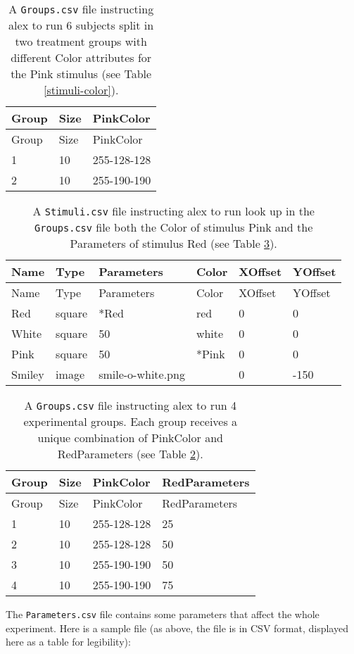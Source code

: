 \documentclass[11pt,]{article}
\begin{document}
\begin{longtable}[c]{@{}lll@{}}
\caption{A \texttt{Groups.csv} file instructing alex to run 6 subjects
split in two treatment groups with different Color attributes for the
Pink stimulus (see Table \ref{stimuli-color}).
\label{subjects-color}}\tabularnewline
\toprule
Group & Size & PinkColor\tabularnewline
\midrule
\endfirsthead
\toprule
Group & Size & PinkColor\tabularnewline
\midrule
\endhead
1 & 10 & 255-128-128\tabularnewline
2 & 10 & 255-190-190\tabularnewline
\bottomrule
\end{longtable}

\begin{longtable}[c]{@{}llllll@{}}
\caption{A \texttt{Stimuli.csv} file instructing alex to run look up in
the \texttt{Groups.csv} file both the Color of stimulus Pink and the
Parameters of stimulus Red (see Table \ref{subjects-color-parameters}).
\label{stimuli-color-parameters}}\tabularnewline
\toprule
Name & Type & Parameters & Color & XOffset & YOffset\tabularnewline
\midrule
\endfirsthead
\toprule
Name & Type & Parameters & Color & XOffset & YOffset\tabularnewline
\midrule
\endhead
Red & square & *Red & red & 0 & 0\tabularnewline
White & square & 50 & white & 0 & 0\tabularnewline
Pink & square & 50 & *Pink & 0 & 0\tabularnewline
Smiley & image & smile-o-white.png & & 0 & -150\tabularnewline
\bottomrule
\end{longtable}

\begin{longtable}[c]{@{}llll@{}}
\caption{A \texttt{Groups.csv} file instructing alex to run 4
experimental groups. Each group receives a unique combination of
PinkColor and RedParameters (see Table \ref{stimuli-color-parameters}).
\label{subjects-color-parameters}}\tabularnewline
\toprule
Group & Size & PinkColor & RedParameters\tabularnewline
\midrule
\endfirsthead
\toprule
Group & Size & PinkColor & RedParameters\tabularnewline
\midrule
\endhead
1 & 10 & 255-128-128 & 25\tabularnewline
2 & 10 & 255-128-128 & 50\tabularnewline
3 & 10 & 255-190-190 & 50\tabularnewline
4 & 10 & 255-190-190 & 75\tabularnewline
\bottomrule
\end{longtable}


The \texttt{Parameters.csv} file contains some parameters that affect
the whole experiment. Here is a sample file (as above, the file is in
CSV format, displayed here as a table for legibility):
\end{document}
